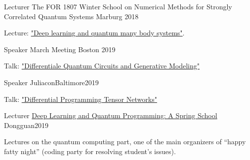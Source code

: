 \documentclass[11pt, a4paper]{awesome-cv}
\begin{document}
%
\begin{cventries}
    \cventry
    {Lecturer}
    {The FOR 1807 Winter School on Numerical Methods for Strongly Correlated Quantum Systems}
    {Marburg}
    {2018}
    {
    \begin{cvitems}
        Lecture: \href{https://github.com/GiggleLiu/marburg}{"Deep learning and quantum many body systems"}.
    \end{cvitems}
    }
\cventry
    {Speaker} %
    {March Meeting} %
    {Boston} %
    {2019} %
    {
    \begin{cvitems}
        Talk: \href{https://meetings.aps.org/Meeting/MAR19/Session/E27.10}{"Differentiale Quantum Circuits and Generative Modeling"}
    \end{cvitems}
    }
\cventry
    {Speaker}
    {Juliacon}{Baltimore}{2019}
    {
    \begin{cvitems}
        Talk: \href{https://www.youtube.com/watch?v=f-CaQMTqjPk}{"Differential Programming Tensor Networks"}
    \end{cvitems}
    }
\cventry
    {Lecturer}
    {\href{https://github.com/QuantumBFS/SSSS}{Deep Learning and Quantum Programming: A Spring School}}
    {Dongguan}{2019}
    {
    \begin{cvitems}
        Lectures on the quantum computing part, one of the main organizers of ``happy fatty night'' (coding party for resolving student's issues).
    \end{cvitems}
    }

\end{cventries}
\end{document}
